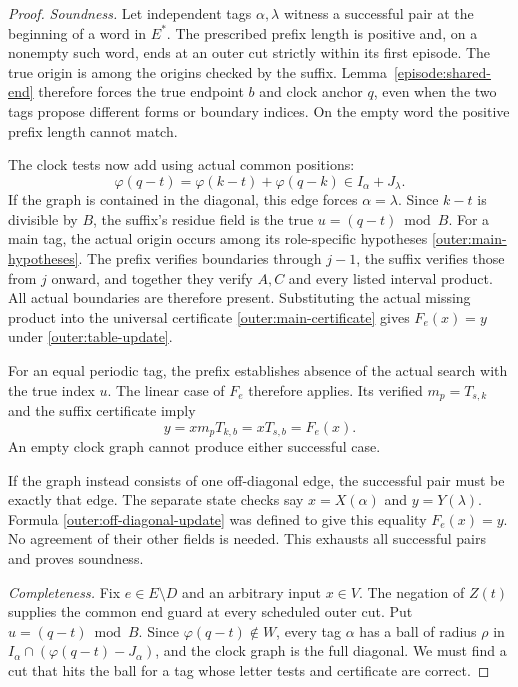 \begin{proof}
\emph{Soundness.} Let independent tags $\alpha,\lambda$ witness a
successful pair at the beginning of a word in $E^*$. The prescribed
prefix length is positive and, on a nonempty such word, ends at an outer
cut strictly within its first episode. The true origin is among the
origins checked by the suffix. Lemma~\ref{episode:shared-end} therefore
forces the true endpoint $b$ and clock anchor $q$, even when the two tags
propose different forms or boundary indices. On the empty word the
positive prefix length cannot match.

The clock tests now add using actual common positions:
\[
 \varphi(q-t)=\varphi(k-t)+\varphi(q-k)\in I_\alpha+J_\lambda.
\]
If the graph is contained in the diagonal, this edge forces
$\alpha=\lambda$. Since $k-t$ is divisible by $B$, the suffix's residue
field is the true $u=(q-t)\bmod B$. For a main tag, the actual origin
occurs among its role-specific hypotheses
\eqref{outer:main-hypotheses}. The prefix verifies boundaries through
$j-1$, the suffix verifies those from $j$ onward, and together they
verify $A,C$ and every listed interval product. All actual boundaries
are therefore present. Substituting the actual missing product into the
universal certificate \eqref{outer:main-certificate} gives
$F_e(x)=y$ under \eqref{outer:table-update}.

For an equal periodic tag, the prefix establishes absence of the actual
search with the true index $u$. The linear case of $F_e$ therefore
applies. Its verified $m_p=T_{s,k}$ and the suffix certificate imply
\[
 y=xm_pT_{k,b}=xT_{s,b}=F_e(x).
\]
An empty clock graph cannot produce either successful case.

If the graph instead consists of one off-diagonal edge, the successful
pair must be exactly that edge. The separate state checks say
$x=X(\alpha)$ and $y=Y(\lambda)$. Formula
\eqref{outer:off-diagonal-update} was defined to give this equality
$F_e(x)=y$. No agreement of their other fields is needed. This exhausts
all successful pairs and proves soundness.

\emph{Completeness.} Fix $e\in E\setminus D$ and an arbitrary input
$x\in V$. The negation of $Z(t)$ supplies the common end guard at every
scheduled outer cut. Put $u=(q-t)\bmod B$. Since
$\varphi(q-t)\notin W$, every tag $\alpha$ has a ball of radius $\rho$
in $I_\alpha\cap(\varphi(q-t)-J_\alpha)$, and the clock graph is the
full diagonal. We must find a cut that hits the ball for a tag whose
letter tests and certificate are correct.


\end{proof}
